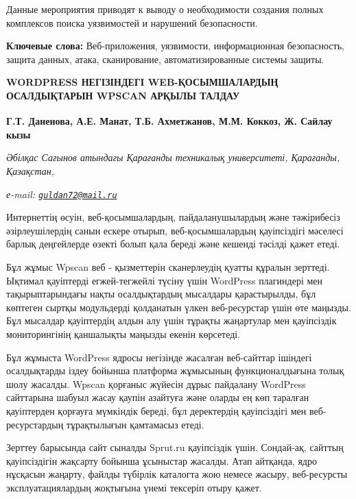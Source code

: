 Данные мероприятия приводят к выводу о необходимости создания полных
комплексов поиска уязвимостей и нарушений безопасности.

{\bfseries Ключевые слова:} Веб-приложения, уязвимости, информационная безопасность,
защита данных, атака, сканирование, автоматизированные системы защиты.

\begin{articleheader}
{\bfseries WORDPRESS НЕГІЗІНДЕГІ WEB-ҚОСЫМШАЛАРДЫҢ ОСАЛДЫҚТАРЫН WPSCAN АРҚЫЛЫ ТАЛДАУ}

{\bfseries
Г.Т. Даненова\textsuperscript{\envelope },
А.Е. Манат,
Т.Б. Ахметжанов,
М.М. Коккоз,
Ж. Сайлау кызы}
\end{articleheader}

\begin{affiliation}
\emph{Әбілқас Сағынов атындағы Қарағанды техникалық университеті, Қарағанды, Қазақстан,}

\emph{е-mail: \href{mailto:guldan72@mail.ru}{\nolinkurl{guldan72@mail.ru}}}
\end{affiliation}

Интернеттің өсуін, веб-қосымшалардың, пайдаланушылардың және тәжірибесіз
әзірлеушілердің санын ескере отырып, веб-қосымшалардың қауіпсіздігі
мәселесі барлық деңгейлерде өзекті болып қала береді және кешенді
тәсілді қажет етеді.

Бұл жұмыс Wpscan веб - қызметтерін сканерлеудің қуатты құралын зерттеді.
Ықтимал қауіптерді егжей-тегжейлі түсіну үшін WordPress плагиндері мен
тақырыптарындағы нақты осалдықтардың мысалдары қарастырылды, бұл
көптеген сыртқы модульдерді қолданатын үлкен веб-ресурстар үшін өте
маңызды. Бұл мысалдар қауіптердің алдын алу үшін тұрақты жаңартулар мен
қауіпсіздік мониторингінің қаншалықты маңызды екенін көрсетеді.

Бұл жұмыста WordPress ядросы негізінде жасалған веб-сайттар ішіндегі
осалдықтарды іздеу бойынша платформа жұмысының функционалдығына толық
шолу жасалды. Wpscan қорғаныс жүйесін дұрыс пайдалану WordPress
сайттарына шабуыл жасау қаупін азайтуға және оларды ең көп таралған
қауіптерден қорғауға мүмкіндік береді, бұл деректердің қауіпсіздігі мен
веб-ресурстардың тұрақтылығын қамтамасыз етеді.

Зерттеу барысында сайт сыналды Sprut.ru қауіпсіздік үшін. Сондай-ақ,
сайттың қауіпсіздігін жақсарту бойынша ұсыныстар жасалды. Атап айтқанда,
ядро нұсқасын жаңарту, файлды түбірлік каталогта жою немесе жасыру,
веб-ресурсты эксплуатациялардың жоқтығына үнемі тексеріп отыру қажет.

